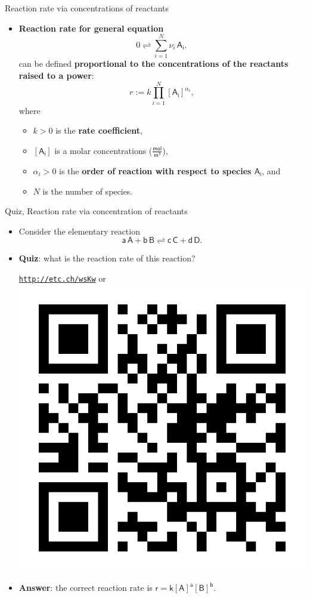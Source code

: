 \begin{frame}[shrink]{Reaction rate via concentrations of reactants}
%
\begin{itemize}
\item \alert{\bf Reaction rate for general equation}
%
\[0 \rightleftharpoons \sum_{i=1}^{N} \nu_i \, \mathsf{A_i},\]
%
can be defined {\bf proportional to the concentrations of the reactants raised to a power}:
%
\[r := k \prod_{i=1}^{N} [\mathsf{A_i}]^{\alpha_i},\]
%
where
%
\begin{itemize}
	\item $k > 0$ is the {\bf rate coefficient}, 
	\item $[\mathsf{A_i}]$ is a molar concentrations ($\mathsf{\tfrac{mol}{m^3}}$), 
	\item $\alpha_i > 0$ is the {\bf order of reaction with respect to species $\mathsf{A_i}$}, %
	and 
	\item $N$ is the number of species.
\end{itemize}
%
\end{itemize}
%
\end{frame}
%
\begin{frame}{Quiz, Reaction rate via concentration of reactants}
	
	\begin{itemize}
		\item Consider the elementary reaction 
		$$\mathsf{a\, A + b\, B \rightleftharpoons c \, C + d \, D}.$$
		\item 
		\alert{\bf Quiz}: what is the reaction rate of this reaction?
		\vskip 5pt
		\begin{center}
    	\href{http://etc.ch/wsKw}{\textcolor{indigo(dye)}{\tt http://etc.ch/wsKw}} \quad
			or 
		    \quad	\includegraphics[height=0.12\columnwidth]{figures/chemical-kinetics/polls.png}
		\end{center}
		\hiddenpause 
		\vskip 10pt
 		\item \alert{\bf Answer}: the correct reaction rate is 
 		$\mathsf{r = k {[A]}^a {[B]}^b}$.
	\end{itemize}
\end{frame}
